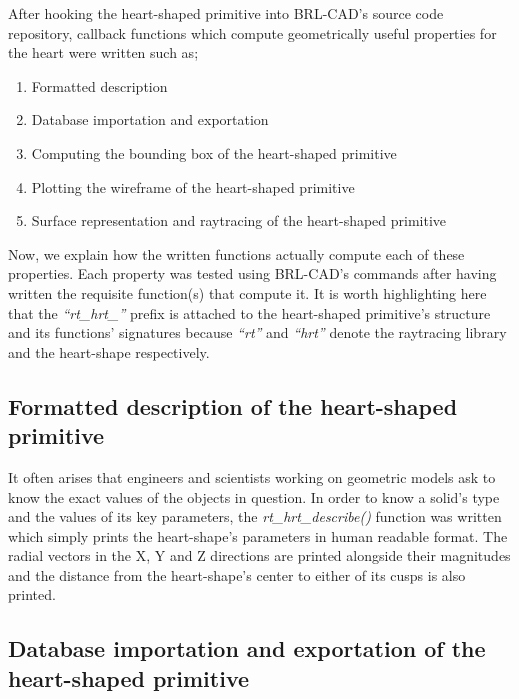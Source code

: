 \hspace{30} After   hooking   the   heart-­shaped   primitive   into   BRL-­CAD's   source   code  
repository,  callback functions which compute geometrically useful properties for the heart were written such as;  
 
\begin{enumerate}
\item Formatted description  
\item Database importation and exportation  
\item Computing the bounding box of the heart­-shaped primitive  
\item Plotting the wireframe of the heart­-shaped primitive  
\item Surface representation and raytracing of the heart-­shaped primitive
\end{enumerate}

\hspace{30} Now, we explain how the written functions actually compute each of these properties.
 Each   property   was   tested   using   BRL-­CAD's   commands \cite{36}   after  having   
written   the   requisite   function(s)   that   compute   it.   It   is   worth   highlighting  
here   that   the   \textit{“rt\_hrt\_”}   prefix   is   attached   to   the   heart­-shaped   primitive's   structure  
and   its   functions'   signatures   because   \textit{“rt”}   and   \textit{“hrt”}   denote   the   raytracing   library  
and the heart-shape respectively.  

\subsection{Formatted description of the heart­-shaped primitive}

\hspace{30} It   often   arises   that   engineers   and   scientists   working   on   geometric   models  
ask   to   know   the   exact   values   of   the   objects   in   question.   In   order   to   know   a  
solid's   type   and   the   values   of   its   key   parameters,  the   \textit{rt\_hrt\_describe()}  
function was written  which   simply   prints   the   heart-shape's   parameters   in   human   readable   format.  
The   radial   vectors   in   the   X,   Y   and   Z   directions   are   printed   alongside   their  
magnitudes   and   the   distance   from   the   heart-shape's   center   to   either   of   its   cusps   is  
also printed.

\subsection{Database importation and exportation of the heart­-shaped primitive}

